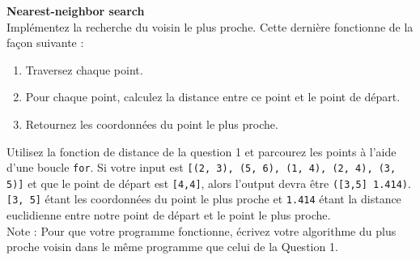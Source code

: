 \begin{Exercice}[10 minutes]\textbf{Nearest-neighbor search}\\

Implémentez la recherche du voisin le plus proche. Cette dernière fonctionne de la façon suivante :
\begin{enumerate}
    \item Traversez chaque point.
    \item Pour chaque point, calculez la distance entre ce point et le point de départ.
    \item Retournez les coordonnées du point le plus proche.
\end{enumerate}
    
\begin{conseil}
    Utilisez la fonction de distance de la question 1 et parcourez les points à l'aide d'une boucle \lstinline{for}. Si votre input est \lstinline{[(2, 3), (5, 6), (1, 4), (2, 4), (3, 5)]} et que le point de départ est \lstinline{[4,4]}, alors l'output devra être \lstinline{([3,5] 1.414)}. \lstinline{[3, 5]} étant les coordonnées du point le plus proche et \lstinline{1.414} étant la distance euclidienne entre notre point de départ et le point le plus proche.  \\
    
    Note : Pour que votre programme fonctionne, écrivez votre algorithme du plus proche voisin dans le même programme que celui de la Question 1.
\end{conseil}
\begin{solution}
    
\end{solution}
\end{Exercice}


